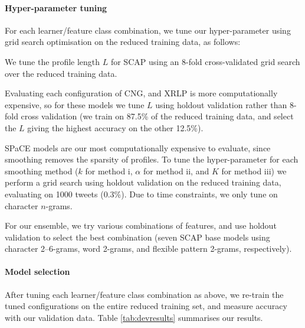\documentclass[twocolumn,10pt]{article}
\begin{document}
\vspace{-3ex}
\paragraph{Hyper-parameter tuning}

For each learner/feature class combination, we tune our hyper-parameter
using grid search optimisation on the reduced training data, as follows:

We tune the profile length $L$ for SCAP using an 8-fold cross-validated
grid search over the reduced training data.

Evaluating each configuration of CNG, and XRLP is more
computationally expensive, so for these models we tune $L$ using
holdout validation rather than 8-fold cross validation
(we train on 87.5\% of the reduced training data, and select the $L$
giving the highest accuracy on the other 12.5\%).

SPaCE models are our most computationally expensive to evaluate,
since smoothing removes the sparsity of profiles.
To tune the hyper-parameter for each smoothing method
($k$ for method i, $\alpha$ for method ii, and $K$ for method iii)
we perform a grid search using holdout validation on the reduced training
data, evaluating on 1000 tweets (0.3\%).
Due to time constraints, we only tune on character $n$-grams.

For our ensemble, we try various combinations of features, and use
holdout validation to select the best combination
(seven SCAP base models using character 2--6-grams, word 2-grams,
and flexible pattern 2-grams, respectively).


\paragraph{Model selection}
After tuning each learner/feature class combination as above,
we re-train the tuned configurations on the entire reduced
training set, and measure accuracy with our validation data.
Table \ref{tab:devresults} summarises our results.
\end{document}
